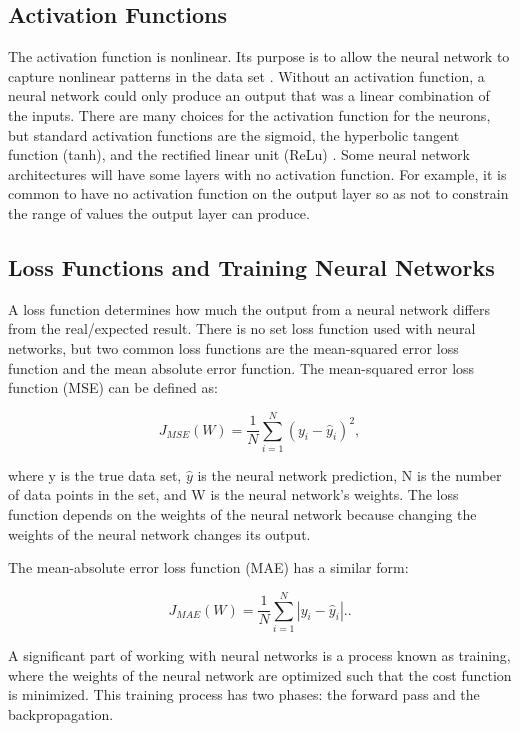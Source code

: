 	\subsection*{Activation Functions}
	The activation function is nonlinear. Its purpose is to allow the neural network to capture nonlinear patterns in the data set \cite{Ref6}. Without an activation function, a neural network could only produce an output that was a linear combination of the inputs. There are many choices for the activation function for the neurons, but standard activation functions are the sigmoid, the hyperbolic tangent function (tanh), and the rectified linear unit (ReLu) \cite{Ref6}. Some neural network architectures will have some layers with no activation function. For example, it is common to have no activation function on the output layer so as not to constrain the range of values the output layer can produce.

	\subsection*{Loss Functions and Training Neural Networks}


		A loss function determines how much the output from a neural network differs from the real/expected result. There is no set loss function used with neural networks, but two common loss functions are the mean-squared error loss function and the mean absolute error function. The mean-squared error loss function (MSE) can be defined as:

		$$J_{MSE}(W) = \frac{1}{N}\sum_{i=1}^N (y_i - \hat{y}_i)^2,$$

		where y is the true data set, $\hat{y}$ is the neural network prediction, N is the number of data points in the set, and W is the neural network's weights. The loss function depends on the weights of the neural network because changing the weights of the neural network changes its output.  

		The mean-absolute error loss function (MAE) has a similar form:

		$$J_{MAE}(W) = \frac{1}{N}\sum_{i=1}^N |y_i - \hat{y}_i|..$$


		A significant part of working with neural networks is a process known as training, where the weights of the neural network are optimized such that the cost function is minimized. This training process has two phases: the forward pass and the backpropagation.

